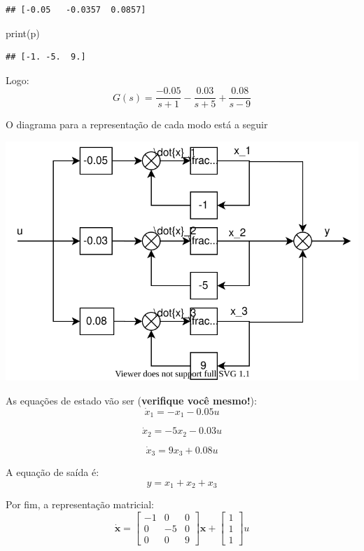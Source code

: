 \documentclass[
]{book}
\newenvironment{Shaded}{\begin{snugshade}}{\end{snugshade}}
\newcommand{\BuiltInTok}[1]{#1}
\newcommand{\NormalTok}[1]{#1}
\begin{document}
\begin{verbatim}
## [-0.05   -0.0357  0.0857]
\end{verbatim}

\begin{Shaded}
\begin{Highlighting}[]
\BuiltInTok{print}\NormalTok{(p)}
\end{Highlighting}
\end{Shaded}

\begin{verbatim}
## [-1. -5.  9.]
\end{verbatim}

Logo:
\[
    G(s) = \frac{-0.05}{s+1}-\frac{0.03}{s+5}+\frac{0.08}{s-9}
\]

O diagrama para a representação de cada modo está a seguir

\includegraphics[width=1\linewidth]{./figs/modal1}

As equações de estado vão ser (\textbf{verifique você mesmo!}):
\[
    \dot{x}_1 = -x_1-0.05u
\]

\[
    \dot{x}_2 = -5x_2-0.03u
\]

\[
    \dot{x}_3 = 9x_3+0.08u
\]

A equação de saída é:
\[
    y = x_1+x_2+x_3
\]

Por fim, a representação matricial:
\[
    \dot{\mathbf{x}} = \left[\begin{array}{rrr}
    -1 & 0 & 0\\
    0 & -5 & 0\\
    0 & 0 & 9
    \end{array}
    \right]\mathbf{x} +
    \left[\begin{array}{r}
    1 \\
    1 \\
    1 
    \end{array}\right]u
\]
\end{document}
